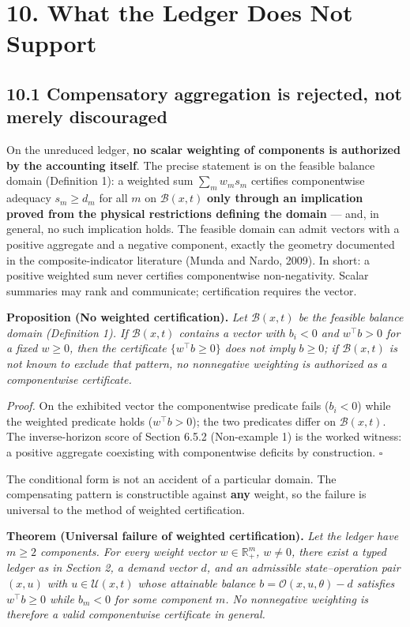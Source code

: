 \documentclass[11pt]{article}
\begin{document}
\section*{10. What the Ledger Does Not Support}\label{10-what-the-ledger-does-not-support}

\subsection*{10.1 Compensatory aggregation is rejected, not merely discouraged}\label{101-compensatory-aggregation-is-rejected-not-merely-discouraged}

On the unreduced ledger, \textbf{no scalar weighting of components is authorized by the accounting itself}. The precise statement is on the feasible balance domain (Definition 1): a weighted sum \(\sum_m w_m s_m\) certifies componentwise adequacy \(s_m\ge d_m\) for all \(m\) on \(\mathcal B(x,t)\) \textbf{only through an implication proved from the physical restrictions defining the domain} --- and, in general, no such implication holds. The feasible domain can admit vectors with a positive aggregate and a negative component, exactly the geometry documented in the composite-indicator literature (Munda and Nardo, 2009). In short: a positive weighted sum never certifies componentwise non-negativity. Scalar summaries may rank and communicate; certification requires the vector.

\textbf{Proposition (No weighted certification).} \emph{Let \(\mathcal{B}(x,t)\) be the feasible balance domain (Definition 1). If \(\mathcal{B}(x,t)\) contains a vector with \(b_i < 0\) and \(w^\top b > 0\) for a fixed \(w \ge 0\), then the certificate \(\{w^\top b \ge 0\}\) does not imply \(b \ge 0\); if \(\mathcal{B}(x,t)\) is not known to exclude that pattern, no nonnegative weighting is authorized as a componentwise certificate.}

\emph{Proof.} On the exhibited vector the componentwise predicate fails (\(b_i < 0\)) while the weighted predicate holds (\(w^\top b > 0\)); the two predicates differ on \(\mathcal{B}(x,t)\). The inverse-horizon score of Section 6.5.2 (Non-example 1) is the worked witness: a positive aggregate coexisting with componentwise deficits by construction. \(\square\)

The conditional form is not an accident of a particular domain. The compensating pattern is constructible against \textbf{any} weight, so the failure is universal to the method of weighted certification.

\textbf{Theorem (Universal failure of weighted certification).} \emph{Let the ledger have \(m \ge 2\) components. For every weight vector \(w \in \mathbb{R}_+^m\), \(w \neq 0\), there exist a typed ledger as in Section 2, a demand vector \(d\), and an admissible state--operation pair \((x, u)\) with \(u \in \mathcal{U}(x,t)\) whose attainable balance \(b =\allowbreak{} \mathcal{O}(x,\allowbreak{}u,\allowbreak{}\theta) - d\) satisfies \(w^\top b \ge 0\) while \(b_m < 0\) for some component \(m\). No nonnegative weighting is therefore a valid componentwise certificate in general.}
\end{document}
